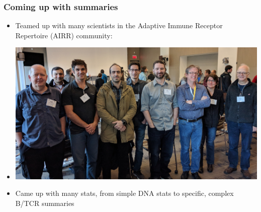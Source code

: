 \documentclass[mathserif,compress]{beamer}
\renewcommand\;{\,}
\begin{document}
\begin{frame}\frametitle{Coming up with summaries}
\begin{itemize}
\item
Teamed up with many scientists in the Adaptive Immune Receptor Repertoire (AIRR) community:
\bigskip
\item[]
\begin{center}
\includegraphics[width=0.9\linewidth]{Images/AIRR.png}
\end{center}
\bigskip
\item
Came up with many stats, from simple DNA stats to specific, complex B/TCR summaries
\end{itemize}
\end{frame}
\end{document}

